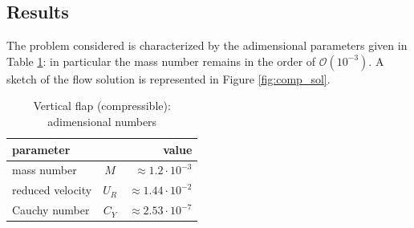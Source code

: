 \subsection{Results}

The problem considered is characterized by the adimensional parameters given in Table \ref{table:comp-adim}: in particular the mass number remains in the order of $\mathcal{O} \left(10^{-3}\right)$. A sketch of the flow solution is represented in Figure \ref{fig:comp_sol}.

\begin{table}[!htb]
	\begin{center}
		\begin{tabular}{ l c | r } 
			parameter & & value   \\ 
			\hline
			mass number  & $M$ & $ \approx 1.2\cdot 10^{-3}$     \\
			reduced velocity & $U_R$ & $ \approx 1.44\cdot 10^{-2}$  \\
			Cauchy number  & $C_Y$ & $  \approx 2.53 \cdot 10^{-7}$  \\			
		\end{tabular}
	\end{center}
	\caption{Vertical flap (compressible): adimensional numbers}
	\label{table:comp-adim}
\end{table}


